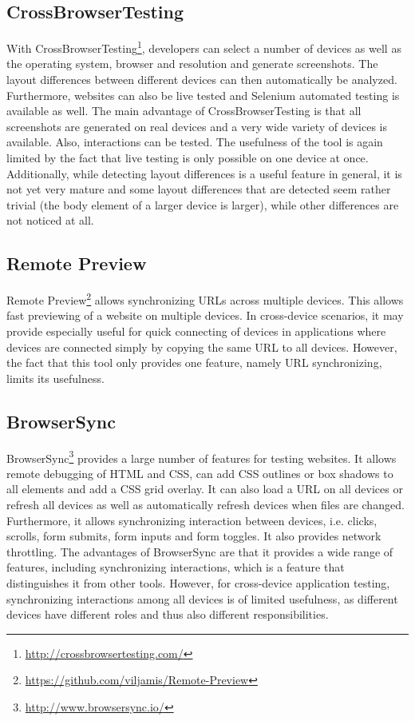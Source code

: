 \subsection{CrossBrowserTesting}

With CrossBrowserTesting\footnote{\url{http://crossbrowsertesting.com/}}, developers can select a number of devices as well as the operating system, browser and resolution and generate screenshots. The layout differences between different devices can then automatically be analyzed. Furthermore, websites can also be live tested and Selenium automated testing is available as well. The main advantage of CrossBrowserTesting is that all screenshots are generated on real devices and a very wide variety of devices is available. Also, interactions can be tested. The usefulness of the tool is again limited by the fact that live testing is only possible on one device at once. Additionally, while detecting layout differences is a useful feature in general, it is not yet very mature and some layout differences that are detected seem rather trivial (the body element of a larger device is larger), while other differences are not noticed at all.

\subsection{Remote Preview}

Remote Preview\footnote{\url{https://github.com/viljamis/Remote-Preview}} allows synchronizing URLs across multiple devices. This allows fast previewing of a website on multiple devices. In cross-device scenarios, it may provide especially useful for quick connecting of devices in applications where devices are connected simply by copying the same URL to all devices. However, the fact that this tool only provides one feature, namely URL synchronizing, limits its usefulness.

\subsection{BrowserSync}

BrowserSync\footnote{\url{http://www.browsersync.io/}} provides a large number of features for testing websites. It allows remote debugging of HTML and CSS, can add CSS outlines or box shadows to all elements and add a CSS grid overlay. It can also load a URL on all devices or refresh all devices as well as automatically refresh devices when files are changed. Furthermore, it allows synchronizing interaction between devices, i.e. clicks, scrolls, form submits, form inputs and form toggles. It also provides network throttling. The advantages of BrowserSync are that it provides a wide range of features, including synchronizing interactions, which is a feature that distinguishes it from other tools. However, for cross-device application testing, synchronizing interactions among all devices is of limited usefulness, as different devices have different roles and thus also different responsibilities.

